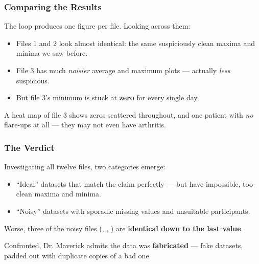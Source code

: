 \documentclass{beamer}
\begin{document}
\begin{frame}[fragile]
    \frametitle{Comparing the Results}
    The loop produces one figure per file. Looking across them:
    \begin{itemize}
        \item Files 1 and 2 look almost identical: the same suspiciously
              clean maxima and minima we saw before.
        \item File 3 has much \emph{noisier} average and maximum plots ---
              actually \emph{less} suspicious.
        \item But file 3's minimum is stuck at \textbf{zero} for every
              single day.
    \end{itemize}

    \bigskip

    A heat map of file 3 shows zeros scattered throughout, and one patient
    with \emph{no} flare-ups at all --- they may not even have arthritis.
\end{frame}

\begin{frame}[fragile]
    \frametitle{The Verdict}
    Investigating all twelve files, two categories emerge:
    \begin{itemize}
        \item ``Ideal'' datasets that match the claim perfectly --- but have
              impossible, too-clean maxima and minima.
        \item ``Noisy'' datasets with sporadic missing values and
              unsuitable participants.
    \end{itemize}

    \bigskip

    Worse, three of the noisy files (, , ) are
    \textbf{identical down to the last value}.

    \bigskip

    Confronted, Dr. Maverick admits the data was \textbf{fabricated} ---
    fake datasets, padded out with duplicate copies of a bad one.
\end{frame}
\end{document}

